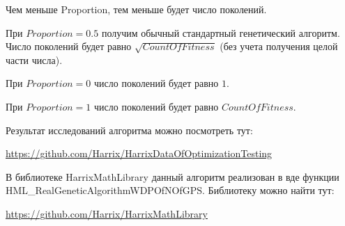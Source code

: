 Чем меньше Proportion, тем меньше будет число поколений.

При $ Proportion=0.5 $ получим обычный стандартный генетический алгоритм. Число поколений будет равно $ \sqrt{CountOfFitness}$ (без учета получения целой части числа).

При $ Proportion=0 $ число поколений будет равно $ 1 $.

При $ Proportion=1 $ число поколений будет равно $ CountOfFitness $.

Результат исследований алгоритма можно посмотреть тут:

\href{https://github.com/Harrix/HarrixDataOfOptimizationTesting}{https://github.com/Harrix/HarrixDataOfOptimizationTesting}

В библиотеке HarrixMathLibrary данный алгоритм реализован в вде функции HML\_RealGeneticAlgorithmWDPOfNOfGPS. Библиотеку можно найти тут:

\href{https://github.com/Harrix/HarrixMathLibrary}{https://github.com/Harrix/HarrixMathLibrary}